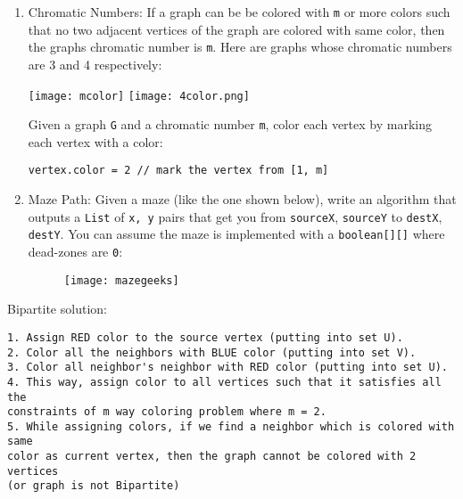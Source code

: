 \documentclass{article}
\begin{document}
\begin{enumerate}
\item Chromatic Numbers: If a graph can be be colored with \texttt{m} or more colors such that no two adjacent vertices of the graph are colored with same color, then the graphs chromatic number is \texttt{m}. Here are graphs whose chromatic numbers are 3 and 4 respectively:
\begin{center}
\texttt{[image: mcolor]}
\texttt{[image: 4color.png]}
\end{center}

Given a graph \texttt{G} and a chromatic number \texttt{m}, color each vertex by marking each vertex with a color:

\texttt{vertex.color = 2 // mark the vertex from [1, m]}

\item Maze Path: Given a maze (like the one shown below), write an algorithm that outputs a \texttt{List} of \texttt{x, y} pairs that get you from \texttt{sourceX}, \texttt{sourceY} to \texttt{destX}, \texttt{destY}. You can assume the maze is implemented with a \texttt{boolean[][]} where dead-zones are \texttt{0}:


\begin{figure}[h]
\centering
\texttt{[image: mazegeeks]}
\end{figure}


\end{enumerate}

\pagebreak

Bipartite solution:
\begin{lstlisting}
1. Assign RED color to the source vertex (putting into set U).
2. Color all the neighbors with BLUE color (putting into set V).
3. Color all neighbor's neighbor with RED color (putting into set U).
4. This way, assign color to all vertices such that it satisfies all the 
constraints of m way coloring problem where m = 2.
5. While assigning colors, if we find a neighbor which is colored with same 
color as current vertex, then the graph cannot be colored with 2 vertices 
(or graph is not Bipartite) 
\end{lstlisting}
\end{document}
